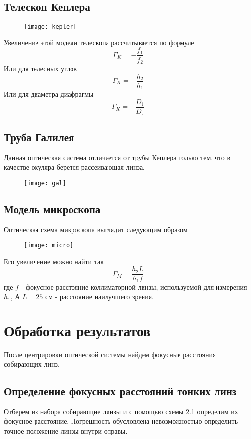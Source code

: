 	\subsection{Телескоп Кеплера}
	
	\begin{figure}[H]
		\centering
		\texttt{[image: kepler]}
	\end{figure}

	Увеличение этой модели телескопа рассчитывается по формуле
	\[
		\Gamma_K = -\frac{f_1}{f_2}
	\]
	Или для телесных углов
	\[
	\Gamma_K = -\frac{h_2}{h_1}
	\]
	Или для диаметра диафрагмы
	\[
	\Gamma_K = -\frac{D_1}{D_2}
	\]
	
	\subsection{Труба Галилея}
		
	Данная оптическая система отличается от трубы Кеплера только тем, что в качестве окуляра берется рассеивающая линза.
	
	\begin{figure}[H]
		\centering
		\texttt{[image: gal]}
	\end{figure}

	\subsection{Модель микроскопа}
	
	Оптическая схема микроскопа выглядит следующим образом
	\begin{figure}[H]
		\centering
		\texttt{[image: micro]}
	\end{figure}

	Его увеличение можно найти так
	\[
		\Gamma_M = \frac{h_2L}{h_1f}
	\]
	где $f$ - фокусное расстояние коллиматорной линзы, используемой для измерения $h_1$, А $L = 25$ см - расстояние наилучшего зрения.
	
	\section{Обработка результатов}
	После центрировки оптической системы найдем фокусные расстояния собирающих линз.
	\subsection{Определение фокусных расстояний тонких линз}
	Отберем из набора собирающие линзы и с помощью схемы 2.1 определим их фокусное расстояние. Погрешность обусловлена невозможностью определить точное положение линзы внутри оправы.
	
